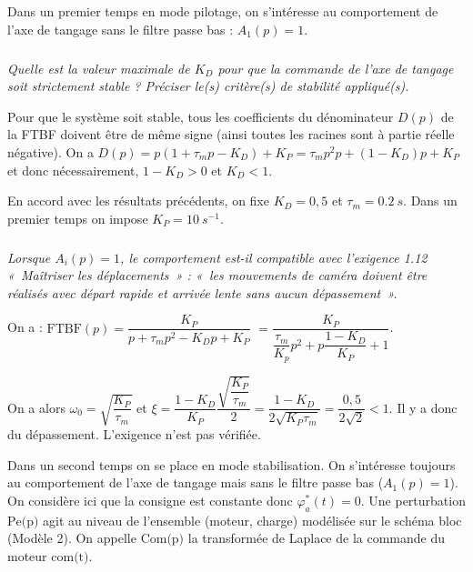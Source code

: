 \documentclass[10pt,fleqn]{article} %
\begin{document}
\begin{multicols}{2}
Dans un premier temps en mode pilotage, on s’intéresse au comportement de l’axe de tangage sans le filtre passe bas :
$A_1(p)=1$.

\subparagraph{}
\textit{Quelle est la valeur maximale de $K_D$ pour que la commande de l’axe de tangage soit strictement
stable ? Préciser le(s) critère(s) de stabilité appliqué(s).}
\ifprof
\begin{corrige}
Pour que le système soit stable, tous les coefficients du dénominateur $D(p)$ de la FTBF doivent être de même signe (ainsi toutes les racines sont à partie réelle négative). On a 
$D(p)=p\left(1+\tau_m p- K_D \right)+K_P = \tau_m p^2 p+ \left(1-K_D \right)p +K_P$ et donc nécessairement, 
$1-K_D >0$ et $K_D < 1$.
\end{corrige}
\else
\fi

En accord avec les résultats précédents, on fixe $K_D = 0,5$ et $\tau_m = \SI{0,2}{s}$.
Dans un premier temps on impose $K_P = \SI{10}{s^{-1}}$.

%
%


\subparagraph{}
\textit{Lorsque $A_i(p)=1$, le comportement est-il compatible avec l’exigence 1.12 «~Maîtriser les déplacements~» :
«~les mouvements de caméra doivent être réalisés avec départ rapide et arrivée lente sans aucun dépassement~». }
\ifprof
\begin{corrige}
On a : $\text{FTBF}(p)=
\dfrac{K_P}{p+\tau_m p^2- K_Dp +K_P}$ 
$=\dfrac{K_P}{\dfrac{\tau_m}{K_p} p^2 + p\dfrac{1- K_D}{K_P} +1}$.

On a alors $\omega_0 = \sqrt{\dfrac{K_P}{\tau_m}}$ et $\xi = \dfrac{1- K_D}{K_P} \dfrac{\sqrt{\dfrac{K_P}{\tau_m}}}{2}= \dfrac{1- K_D}{2\sqrt{K_P \tau_m}}= \dfrac{0,5}{2\sqrt{2}} <1$. Il y a donc du dépassement. L'exigence n'est pas vérifiée. 
\end{corrige}
\else
\fi


Dans un second temps on se place en mode stabilisation. On s’intéresse toujours au comportement de l’axe de
tangage mais sans le filtre passe bas ($A_1(p)=1$).
On considère ici que la consigne est constante donc $\varphi^*_a(t)=0$. Une perturbation $\text{Pe(p)}$ agit au niveau de l’ensemble (moteur, charge) modélisée sur le schéma bloc (Modèle 2). On appelle $\text{Com(p)}$ la transformée de Laplace de la commande du moteur $\text{com(t)}$.


\end{multicols}
\end{document}
